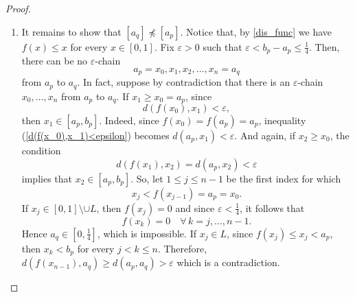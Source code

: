 \documentclass[10pt,a4paper]{amsart}
\begin{document}
\begin{proof}
\begin{enumerate}
Fix $\varepsilon>0$.
If $\varepsilon> a_q-b_p$ then the three points $a_q, b_p, a_p$ form an $\varepsilon$-chain from $a_q$ to $a_p$.
Indeed, $d(f(a_q),b_p)=d(a_q,b_p)<\varepsilon$ and $f(b_p)=a_p$.
So suppose that $\varepsilon<a_q-b_p$. 
By \eqref{eq_mis_compl} and since $(L,<_\mathcal{P})$ is densely ordered, there is $n$ sufficiently large that we can choose $n-2$ intervals 
\[
J_{n-2}<_\mathcal{P} J_{n-1}<_\mathcal{P}\cdots <_\mathcal{P} J_1
\]
in $L$ with $J_1=[x_1,y_1]$, $J_2=[x_2,y_2]$, $\ldots$, $J_{n-2}=[x_{n-2},y_{n-2}]$, such that
\begin{align*}
    &d(a_q,y_1)<\varepsilon\\
    &d(x_1,y_2)<\varepsilon\\
    &\quad\quad\vdots\\
    &d(x_{n-3},y_{n-2})<\varepsilon\\
    &d(x_{n-2},b_p)<\varepsilon
\end{align*}
From the definition of $f$ given by \eqref{dis_func}, we have that $f(a_q)=a_q$ and $f(y_i)=x_i$ for every $i=1,\ldots,n-2$. Therefore, we can rewrite the previous inequalities as
\begin{align*}
    &d(f(a_q),y_1)<\varepsilon\\
    &d(f(y_1),y_2)<\varepsilon\\
    &\quad\qquad\vdots\\
    &d(f(y_{n-3}),y_{n-2})<\varepsilon\\
    &d(f(y_{n-2}),b_p)<\varepsilon
\end{align*}
Since $f(b_p)=a_p$, it follows that the points
$$
a_q,y_1,y_2,\ldots,y_{n-2},b_p, a_p
$$
form an $\varepsilon$-chain from $a_q$ to $a_p$. 
We conclude that $[a_p]\preceq [a_q]$.

\item It remains to show that $[a_q]\not\preceq [a_p]$.
Notice that, by \eqref{dis_func} we have $f(x)\le x$ for every $x\in [0,1]$.
Fix $\varepsilon>0$ such that $\varepsilon< b_p-a_p\leq\frac{1}{4}$.
Then, there can be no $\varepsilon$-chain 
\[
a_p=x_0,x_1,x_2,\ldots,x_n=a_q
\]
from $a_p$ to $a_q$.
In fact, suppose by contradiction that there is an $\varepsilon$-chain  $x_0,\ldots,x_n$ from $a_p$ to $a_q$. If $x_1\ge x_0=a_p$, since 
\begin{equation}\label{d(f(x_0),x_1)<epsilon}
d(f(x_0),x_1)<\varepsilon,
\end{equation}
then $x_1\in [a_p,b_p]$. Indeed, since $f(x_0)=f(a_p)=a_p$, inequality (\ref{d(f(x_0),x_1)<epsilon}) becomes $d(a_p,x_1)<\varepsilon$.
And again, if $x_2\ge x_0$, the condition 
$$
d(f(x_1),x_2)=d(a_p,x_2)<\varepsilon
$$
implies that $x_2\in [a_p,b_p]$.
So, let $1\le j\le n-1$ be the first index for which 
$$
x_j< f(x_{j-1})=a_p=x_0.
$$
If $x_j\in [0,1]\setminus \cup L$, then $f(x_j)=0$ and since $\varepsilon<\frac 1 4$, it follows that 
$$
f(x_{k})=0 \quad \forall\, k=j,\ldots,n-1.
$$ 
Hence $a_q\in[0,\frac 1 4]$, which is impossible.
If $x_j\in L$, since $f(x_j)\le  x_j< a_p$, then $x_k < b_p$ for every $j<k\le n$. Therefore, $d(f(x_{n-1}),a_q)\ge d(a_p,a_q)>\varepsilon$ which is a contradiction.
\end{enumerate}


\end{proof}
\end{document}
